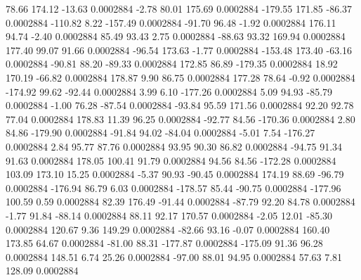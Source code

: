        78.66      174.12      -13.63     0.0002884
       -2.78       80.01      175.69     0.0002884
     -179.55      171.85      -86.37     0.0002884
     -110.82        8.22     -157.49     0.0002884
      -91.70       96.48       -1.92     0.0002884
      176.11       94.74       -2.40     0.0002884
       85.49       93.43        2.75     0.0002884
      -88.63       93.32      169.94     0.0002884
      177.40       99.07       91.66     0.0002884
      -96.54      173.63       -1.77     0.0002884
     -153.48      173.40      -63.16     0.0002884
      -90.81       88.20      -89.33     0.0002884
      172.85       86.89     -179.35     0.0002884
       18.92      170.19      -66.82     0.0002884
      178.87        9.90       86.75     0.0002884
      177.28       78.64       -0.92     0.0002884
     -174.92       99.62      -92.44     0.0002884
        3.99        6.10     -177.26     0.0002884
        5.09       94.93      -85.79     0.0002884
       -1.00       76.28      -87.54     0.0002884
      -93.84       95.59      171.56     0.0002884
       92.20       92.78       77.04     0.0002884
      178.83       11.39       96.25     0.0002884
      -92.77       84.56     -170.36     0.0002884
        2.80       84.86     -179.90     0.0002884
      -91.84       94.02      -84.04     0.0002884
       -5.01        7.54     -176.27     0.0002884
        2.84       95.77       87.76     0.0002884
       93.95       90.30       86.82     0.0002884
      -94.75       91.34       91.63     0.0002884
      178.05      100.41       91.79     0.0002884
       94.56       84.56     -172.28     0.0002884
      103.09      173.10       15.25     0.0002884
       -5.37       90.93      -90.45     0.0002884
      174.19       88.69      -96.79     0.0002884
     -176.94       86.79        6.03     0.0002884
     -178.57       85.44      -90.75     0.0002884
     -177.96      100.59        0.59     0.0002884
       82.39      176.49      -91.44     0.0002884
      -87.79       92.20       84.78     0.0002884
       -1.77       91.84      -88.14     0.0002884
       88.11       92.17      170.57     0.0002884
       -2.05       12.01      -85.30     0.0002884
      120.67        9.36      149.29     0.0002884
      -82.66       93.16       -0.07     0.0002884
      160.40      173.85       64.67     0.0002884
      -81.00       88.31     -177.87     0.0002884
     -175.09       91.36       96.28     0.0002884
      148.51        6.74       25.26     0.0002884
      -97.00       88.01       94.95     0.0002884
       57.63        7.81      128.09     0.0002884
